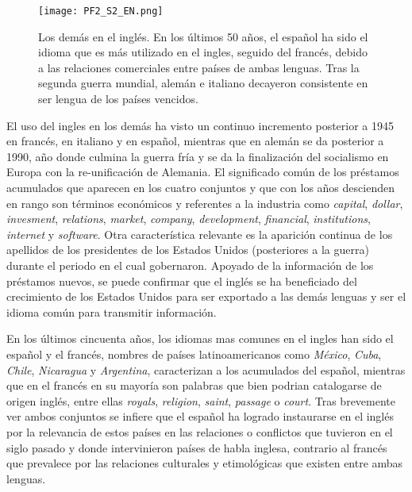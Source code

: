 \begin{figure}[h!]
	\centering
	\texttt{[image: PF2\_S2\_EN.png]}
	\label{fig.ST_b_EN}
	\caption{Los demás en el inglés. En los últimos 50 años, el español ha sido el idioma que es más utilizado en el ingles, seguido del francés, debido a las relaciones comerciales entre países de ambas lenguas.  Tras la segunda guerra mundial, alemán e italiano decayeron consistente en ser lengua de los países vencidos. }
\end{figure} 



El uso del ingles en los demás ha visto un continuo incremento posterior a 1945 en francés, en italiano y en español, mientras que en  alemán se da posterior a 1990, año donde culmina la guerra fría y se da la finalización del socialismo en Europa con la re-unificación de Alemania. El significado común de los   préstamos acumulados que aparecen en los cuatro conjuntos y que con los años descienden en rango son términos económicos y referentes a la industria como  \textit{capital}, \textit{dollar}, \textit{invesment}, \textit{relations}, \textit{market}, \textit{company}, \textit{development}, \textit{financial},  \textit{institutions}, \textit{internet} y \textit{software}. Otra característica relevante es la aparición continua de los apellidos de los presidentes de los Estados Unidos (posteriores a la guerra) durante el periodo en el cual gobernaron.  Apoyado de la información de los préstamos nuevos, se puede confirmar que el inglés se ha beneficiado del crecimiento de los Estados Unidos para ser exportado a las demás lenguas y ser el idioma común para transmitir información.   


En los últimos cincuenta años, los idiomas mas comunes en el ingles han sido el español y el francés,  nombres de países latinoamericanos como \textit{México}, \textit{Cuba}, \textit{Chile}, \textit{Nicaragua} y \textit{Argentina}, caracterizan a los acumulados del español, mientras que en el francés en su mayoría son palabras que bien podrian catalogarse de origen inglés, entre ellas \textit{royals}, \textit{religion}, \textit{saint}, \textit{passage} o \textit{court}. Tras brevemente ver ambos conjuntos se infiere que el español ha logrado instaurarse en el inglés por la relevancia de estos países en las relaciones o conflictos que tuvieron en el siglo pasado y donde intervinieron países de habla inglesa, contrario  al francés que prevalece por las relaciones culturales y etimológicas que existen entre ambas lenguas.

